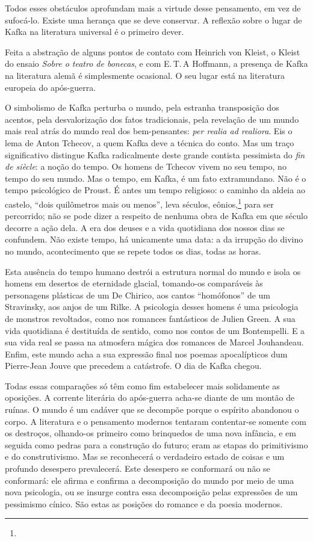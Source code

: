 Todos esses obstáculos aprofundam
mais a virtude desse pensamento, em vez
de sufocá-lo. Existe uma herança que se deve conservar. A reflexão sobre o lugar de Kafka na literatura universal é o primeiro dever.

Feita a abstração de alguns pontos de contato com Heinrich von Kleist, o Kleist
do ensaio \textit{Sobre o teatro de bonecas}, e com E.\,T.\,A Hoffmann, a presença
de Kafka na literatura alemã é simplesmente ocasional. O seu lugar está
na literatura europeia do após-guerra.

O simbolismo de Kafka perturba
o mundo, pela estranha transposição dos acentos, pela desvalorização dos fatos tradicionais, pela revelação de um mundo mais real atrás do mundo real dos bem-pensantes: \textit{per realia ad realiora}. Eis o lema de Anton Tchecov, a quem Kafka deve a técnica do conto. Mas
um traço significativo distingue Kafka radicalmente deste grande
contista pessimista do \textit{fin de siècle}: a noção do tempo. Os homens de
Tchecov vivem no seu tempo, no tempo do seu
mundo. Mas o tempo, em Kafka, é um fato extramundano. Não é o tempo
psicológico de Proust. É antes um tempo religioso: o caminho da aldeia ao castelo, ``dois quilômetros mais ou menos'', leva séculos, eônios,\footnote{} para ser
percorrido; não se pode dizer a respeito de nenhuma obra de Kafka em que
século decorre a ação dela. A era dos deuses e a vida quotidiana dos
nossos dias se confundem. Não existe tempo, há unicamente uma data: a da
irrupção do divino no mundo, acontecimento que se repete todos os dias, todas as horas.

Esta ausência do tempo humano destrói a estrutura
normal do mundo e isola os
homens em desertos de eternidade glacial, tomando-os comparáveis às
personagens plásticas de um De Chirico, aos cantos ``homófonos'' de um
Stravinsky, aos anjos de um Rilke. A psicologia desses homens é uma
psicologia de monstros revoltados, como nos romances fantásticos de
Julien Green. A sua vida quotidiana é destituída de sentido, como nos
contos de um Bontempelli. E a sua vida real se
passa na atmosfera mágica dos romances de Marcel Jouhandeau. Enfim, este
mundo acha a sua expressão final nos poemas apocalípticos dum
Pierre-Jean Jouve que precedem a catástrofe. O dia de Kafka chegou.

Todas essas comparações só têm como fim estabelecer mais solidamente as oposições. A corrente literária do após-guerra acha-se diante de um montão de 
ruínas. O mundo é um cadáver que se decompõe porque o espírito abandonou
o corpo. A literatura e o pensamento modernos tentaram contentar-se
somente com os destroços, olhando-os primeiro como brinquedos de uma
nova infância, e em seguida como pedras para a construção do futuro;
eram as etapas do primitivismo e do construtivismo. Mas se reconhecerá o
verdadeiro estado de coisas e um profundo desespero prevalecerá. Este
desespero se conformará ou não se conformará: ele afirma e confirma a
decomposição do mundo por meio de uma nova psicologia, ou se insurge
contra essa \mbox{decomposição} pelas expressões de um pessimismo cínico. São
estas as posições do romance e da poesia modernos.

